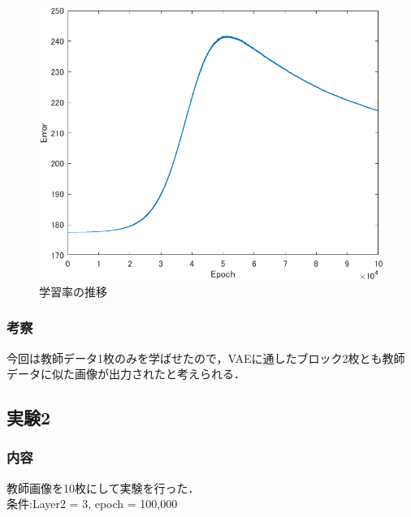 \documentclass[twocolumn, a4j]{jsarticle}
\begin{document}
\begin{figure}
  \begin{center}
    \includegraphics[width=0.9\columnwidth]{figure/archive20241219-figure3.png}
  \end{center}
  \caption{学習率の推移}
  \label{fig:3-5}
\end{figure}

\subsubsection{考察}
今回は教師データ1枚のみを学ばせたので，VAEに通したブロック2枚とも教師データに似た画像が出力されたと考えられる．

\subsection{実験2}
\subsubsection{内容}
教師画像を10枚にして実験を行った．
\\条件:Layer2 = 3, epoch = 100,000
\end{document}
